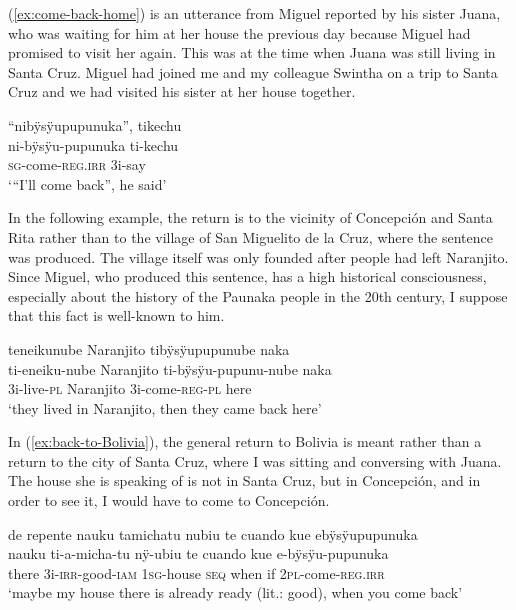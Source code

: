 (\ref{ex:come-back-home}) is an utterance from Miguel reported by his sister Juana, who was waiting for him at her house the previous day because Miguel had promised to visit her again. This was at the time when Juana was still living in Santa Cruz. Miguel had joined me and my colleague Swintha on a trip to Santa Cruz and we had visited his sister at her house together.

\ea\label{ex:come-back-home}
\begingl 
\glpreamble “nibÿsÿupupunuka”, tikechu\\
\gla ni-bÿsÿu-pupunuka ti-kechu\\ 
\textsc{sg}-come-\textsc{reg.irr} 3i-say\\ 
\glft ‘“I’ll come back”, he said’
\trailingcitation{[jxx-p120430l-1.124]}
\xe

In the following example, the return is to the vicinity of Concepción and Santa Rita rather than to the village of San Miguelito de la Cruz, where the sentence was produced. The village itself was only founded after people had left Naranjito. Since Miguel, who produced this sentence, has a high historical consciousness, especially about the history of the Paunaka people in the 20th century, I suppose that this fact is well-known to him. %

\ea\label{ex:Naranjito-back-here}
\begingl 
\glpreamble teneikunube Naranjito tibÿsÿupupunube naka\\
\gla ti-eneiku-nube Naranjito ti-bÿsÿu-pupunu-nube naka\\ 
\glb 3i-live-\textsc{pl} Naranjito 3i-come-\textsc{reg}-\textsc{pl} here\\ 
\glft ‘they lived in Naranjito, then they came back here’
\trailingcitation{[mqx-p110826l.084]}
\xe


In (\ref{ex:back-to-Bolivia}), the general return to Bolivia is meant rather than a return to the city of Santa Cruz, where I was sitting and conversing with Juana. The house she is speaking of is not in Santa Cruz, but in Concepción, and in order to see it, I would have to come to Concepción.

\ea\label{ex:back-to-Bolivia}
\begingl 
\glpreamble de repente nauku tamichatu nubiu te cuando kue ebÿsÿupupunuka\\
 nauku ti-a-micha-tu nÿ-ubiu te cuando kue e-bÿsÿu-pupunuka\\ 
 there 3i-\textsc{irr}-good-\textsc{iam} 1\textsc{sg}-house \textsc{seq} when if 2\textsc{pl}-come-\textsc{reg.irr}\\ 
\glft ‘maybe my house there is already ready (lit.: good), when you come back’
\trailingcitation{[jxx-p120430l-1.427]}
\xe 

